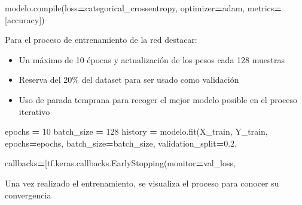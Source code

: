 \documentclass[
  a4paper,
  DIV=11,
  numbers=noendperiod]{scrreprt}
\newenvironment{Shaded}{\begin{snugshade}}{\end{snugshade}}
\newcommand{\BuiltInTok}[1]{#1}
\newcommand{\DecValTok}[1]{\textcolor[rgb]{0.00,0.00,0.81}{#1}}
\newcommand{\FloatTok}[1]{\textcolor[rgb]{0.00,0.00,0.81}{#1}}
\newcommand{\NormalTok}[1]{#1}
\newcommand{\OperatorTok}[1]{\textcolor[rgb]{0.81,0.36,0.00}{\textbf{#1}}}
\newcommand{\StringTok}[1]{\textcolor[rgb]{0.31,0.60,0.02}{#1}}
\providecommand{\tightlist}{%
  \setlength{\itemsep}{0pt}\setlength{\parskip}{0pt}}\usepackage{longtable,booktabs,array}
\begin{document}
\begin{Shaded}
\begin{Highlighting}[numbers=left,,]
\NormalTok{modelo.}\BuiltInTok{compile}\NormalTok{(loss}\OperatorTok{=}\StringTok{\textquotesingle{}categorical\_crossentropy\textquotesingle{}}\NormalTok{, optimizer}\OperatorTok{=}\StringTok{\textquotesingle{}adam\textquotesingle{}}\NormalTok{,}
\NormalTok{metrics}\OperatorTok{=}\NormalTok{[}\StringTok{\textquotesingle{}accuracy\textquotesingle{}}\NormalTok{])}
\end{Highlighting}
\end{Shaded}

Para el proceso de entrenamiento de la red destacar:

\begin{itemize}
\tightlist
\item
  Un máximo de 10 épocas y actualización de los pesos cada 128 muestras
\item
  Reserva del 20\% del dataset para ser usado como validación
\item
  Uso de parada temprana para recoger el mejor modelo posible en el
  proceso iterativo
\end{itemize}

\begin{Shaded}
\begin{Highlighting}[numbers=left,,]
\NormalTok{epochs }\OperatorTok{=} \DecValTok{10}
\NormalTok{batch\_size }\OperatorTok{=} \DecValTok{128}
\NormalTok{history }\OperatorTok{=}\NormalTok{ modelo.fit(X\_train, Y\_train,}
\NormalTok{epochs}\OperatorTok{=}\NormalTok{epochs,}
\NormalTok{batch\_size}\OperatorTok{=}\NormalTok{batch\_size,}
\NormalTok{validation\_split}\OperatorTok{=}\FloatTok{0.2}\NormalTok{,}

\NormalTok{callbacks}\OperatorTok{=}\NormalTok{[tf.keras.callbacks.EarlyStopping(monitor}\OperatorTok{=}\StringTok{\textquotesingle{}val\_loss\textquotesingle{}}\NormalTok{,}
\end{Highlighting}
\end{Shaded}

Una vez realizado el entrenamiento, se visualiza el proceso para conocer
su convergencia
\end{document}
